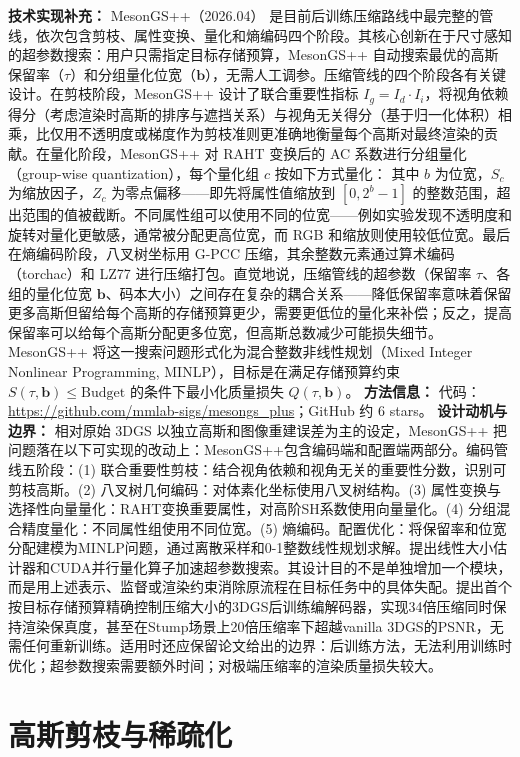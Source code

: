 \textbf{技术实现补充：} MesonGS++（2026.04） 是目前后训练压缩路线中最完整的管线，依次包含剪枝、属性变换、量化和熵编码四个阶段。其核心创新在于尺寸感知的超参数搜索：用户只需指定目标存储预算，MesonGS++ 自动搜索最优的高斯保留率（$\tau$）和分组量化位宽（$\mathbf{b}$），无需人工调参。压缩管线的四个阶段各有关键设计。在剪枝阶段，MesonGS++ 设计了联合重要性指标 $I_g = I_d \cdot I_i$，将视角依赖得分（考虑渲染时高斯的排序与遮挡关系）与视角无关得分（基于归一化体积）相乘，比仅用不透明度或梯度作为剪枝准则更准确地衡量每个高斯对最终渲染的贡献。在量化阶段，MesonGS++ 对 RAHT 变换后的 AC 系数进行分组量化（group-wise quantization），每个量化组 $c$ 按如下方式量化： 其中 $b$ 为位宽，$S_c$ 为缩放因子，$Z_c$ 为零点偏移——即先将属性值缩放到 $[0, 2^b{-}1]$ 的整数范围，超出范围的值被截断。不同属性组可以使用不同的位宽——例如实验发现不透明度和旋转对量化更敏感，通常被分配更高位宽，而 RGB 和缩放则使用较低位宽。最后在熵编码阶段，八叉树坐标用 G-PCC 压缩，其余整数元素通过算术编码（torchac）和 LZ77 进行压缩打包。直觉地说，压缩管线的超参数（保留率 $\tau$、各组的量化位宽 $\mathbf{b}$、码本大小）之间存在复杂的耦合关系——降低保留率意味着保留更多高斯但留给每个高斯的存储预算更少，需要更低位的量化来补偿；反之，提高保留率可以给每个高斯分配更多位宽，但高斯总数减少可能损失细节。MesonGS++ 将这一搜索问题形式化为混合整数非线性规划（Mixed Integer Nonlinear Programming, MINLP），目标是在满足存储预算约束 $S(\tau, \mathbf{b}) \leq \mathrm{Budget}$ 的条件下最小化质量损失 $Q(\tau, \mathbf{b})$。
\textbf{方法信息：} 代码：\url{https://github.com/mmlab-sigs/mesongs_plus}；GitHub 约 6 stars。
\textbf{设计动机与边界：} 相对原始 3DGS 以独立高斯和图像重建误差为主的设定，MesonGS++ 把问题落在以下可实现的改动上：MesonGS++包含编码端和配置端两部分。编码管线五阶段：(1) 联合重要性剪枝：结合视角依赖和视角无关的重要性分数，识别可剪枝高斯。(2) 八叉树几何编码：对体素化坐标使用八叉树结构。(3) 属性变换与选择性向量量化：RAHT变换重要属性，对高阶SH系数使用向量量化。(4) 分组混合精度量化：不同属性组使用不同位宽。(5) 熵编码。配置优化：将保留率和位宽分配建模为MINLP问题，通过离散采样和0-1整数线性规划求解。提出线性大小估计器和CUDA并行量化算子加速超参数搜索。其设计目的不是单独增加一个模块，而是用上述表示、监督或渲染约束消除原流程在目标任务中的具体失配。提出首个按目标存储预算精确控制压缩大小的3DGS后训练编解码器，实现34倍压缩同时保持渲染保真度，甚至在Stump场景上20倍压缩率下超越vanilla 3DGS的PSNR，无需任何重新训练。适用时还应保留论文给出的边界：后训练方法，无法利用训练时优化；超参数搜索需要额外时间；对极端压缩率的渲染质量损失较大。

\section{高斯剪枝与稀疏化}

